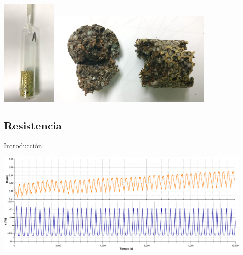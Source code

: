 \documentclass[usenames,dvipsnames]{beamer}
\begin{document}
\begin{frame}

\begin{center}

\includegraphics[width=0.2\textwidth]{img/tamgrano/EspCuarzo.jpg}
\includegraphics[width=0.6\textwidth]{img/tamgrano/EspRota.jpg}

\end{center}



\end{frame}


\subsection{Resistencia}

\begin{frame}
 Introducción
 
  \includegraphics[width=0.95\textwidth]{img/resistencia/Ciclos.eps}

\end{frame}
\end{document}
